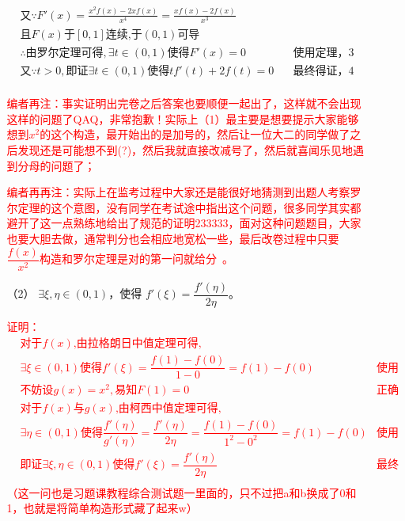 \documentclass[a4paper,12pt]{article}
\begin{document}
\begin{enumerate}
\begin{enumerate}
{\begin{align*}
            &\text{又} \because F'(x)=\frac{x^2f(x)-2xf(x)}{x^4}=\frac{xf(x)-2f(x)}{x^3} \\
            &\text{且} F(x)\text{于}[0,1]\text{连续,} \text{于}(0,1)\text{可导}  \\
            &\therefore\text{由罗尔定理可得},\exists t \in (0, 1) \text{使得}F'(x)=0 \quad & \text{使用定理，3分}\\ 
            &\text{又} \because t>0,\text{即证} \exists t \in (0, 1)\text{使得}tf'(t)+2f(t) = 0\quad & \text{最终得证，4分}\\
            \end{align*}
        }
        \item[]\textcolor{red}{编者再注：事实证明出完卷之后答案也要顺便一起出了，这样就不会出现这样的问题了QAQ，非常抱歉！实际上（1）最主要是想要提示大家能够想到$x^2$的这个构造，最开始出的是加号的，然后让一位大二的同学做了之后发现还是可能想不到(?)，然后我就直接改减号了，然后就喜闻乐见地遇到分母的问题了；}
        \item[]\textcolor{red}{编者再再注：实际上在监考过程中大家还是能很好地猜测到出题人考察罗尔定理的这个意图，没有同学在考试途中指出这个问题，很多同学其实都避开了这一点熟练地给出了规范的证明233333，面对这种问题题目，大家也要大胆去做，通常判分也会相应地宽松一些，最后改卷过程中只要$\dfrac{f(x)}{x^2}$构造和罗尔定理是对的第一问就给分~。}
        \item[（2）]\(\exists \xi, \eta \in (0, 1) \)，使得 \( f'(\xi) = \dfrac{f'(\eta)}{2\eta}  \)。
        \item[] \item[] \textcolor{red}{
            证明：
            \begin{align*}
            &\text{对于}f(x)\text{,由拉格朗日中值定理可得},\\
            &\exists \xi \in (0, 1) \text{使得}f'(\xi)=\dfrac{f(1)-f(0)}{1-0}=f(1)-f(0) \quad & \text{使用定理，1分}\\ 
            &\text{不妨设} g(x)=x^2, \text{易知} F(1)=0 \quad & \text{正确构造，2分}\\
            &\text{对于}f(x)\text{与}g(x)\text{,由柯西中值定理可得},\\
            &\exists \eta \in (0, 1) \text{使得}\dfrac{f'(\eta)}{g'(\eta)}=\dfrac{f'(\eta)}{2\eta}=\dfrac{f(1)-f(0)}{1^2-0^2}=f(1)-f(0) \quad & \text{使用定理，3分}\\ 
            &\text{即证} \exists \xi,\eta \in (0, 1)\text{使得}f'(\xi) = \dfrac{f'(\eta)}{2\eta}\quad & \text{最终得证，4分}\\
            \end{align*}
            （这一问也是习题课教程综合测试题一里面的，只不过把a和b换成了0和1，也就是将简单构造形式藏了起来w）
        }
    \end{enumerate}
\end{enumerate}
\end{document}
